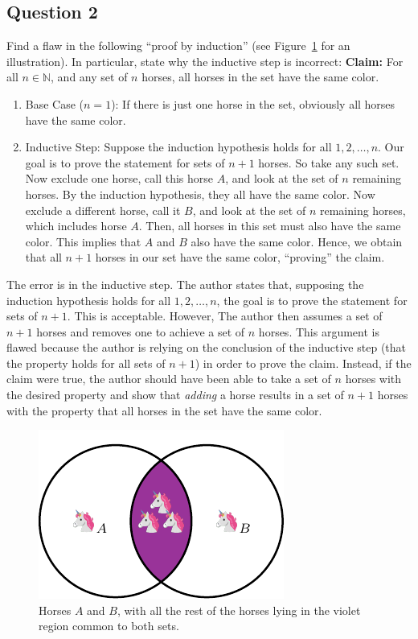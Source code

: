 \subsection*{Question 2}
Find a flaw in the following ``proof by induction'' (see Figure~\ref{fig:horse} for an illustration). In particular, state why the inductive step is incorrect:
\vspace{0.5cm}
\noindent \textbf{Claim:} For all $n \in \mathbb{N}$, and any set of $n$ horses, all horses in the set have the same color.
\begin{enumerate}
    \item Base Case ($n=1$): If there is just one horse in the set, obviously all horses have the same color.
    \item Inductive Step: Suppose the induction hypothesis holds for all $1,2,\ldots,n$. Our goal is to prove the statement for sets of $n+1$ horses. So take any such set. Now exclude one horse, call this horse $A$, and look at the set of $n$ remaining horses. By the induction hypothesis, they all have the same color. Now exclude a different horse, call it $B$, and look at the set of $n$ remaining horses, which includes horse $A$. Then, all horses in this set must also have the same color. This implies that $A$ and $B$ also have the same color. Hence, we obtain that all $n+1$ horses in our set have the same color, ``proving'' the claim. 
\end{enumerate}
\begin{solution}
The error is in the inductive step. The author states that, supposing the induction hypothesis holds for all $1,2,\dots,n$, the goal is to prove the statement for sets of $n+1$. This is acceptable. However, The author then assumes a set of $n+1$ horses and removes one to achieve a set of $n$ horses. This argument is flawed because the author is relying on the conclusion of the inductive step (that the property holds for all sets of $n+1$) in order to prove the claim. Instead, if the claim were true, the author should have been able to take a set of $n$ horses with the desired property and show that \textit{adding} a horse results in a set of $n+1$ horses with the property that all horses in the set have the same color.
\end{solution}
\begin{figure}[h]
    \centering
    \includegraphics{images/horse_venn.pdf}
    \caption{Horses $A$ and $B$, with all the rest of the horses lying in the violet region common to both sets.}
    \label{fig:horse}
\end{figure}
